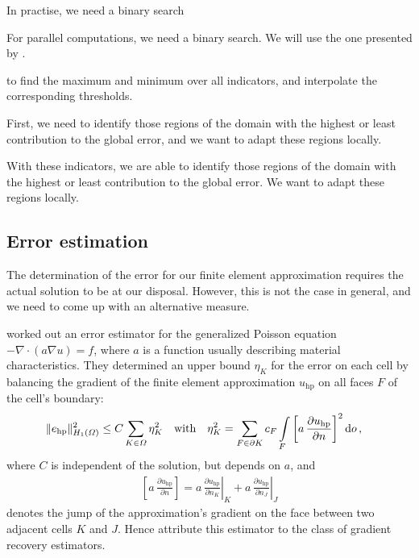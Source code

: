 In practise, we need a binary search 

For parallel computations, we need a binary search. We will use the one presented by \textcites[Sec.~3.1]{burstedde2008}[Sec.~5.1]{bangerth2012}.



to find the maximum and minimum over all indicators, and interpolate the corresponding thresholds.





First, we need to identify those regions of the domain with the highest or least contribution to the global error, and we want to adapt these regions locally.

With these indicators, we are able to identify those regions of the domain with the highest or least contribution to the global error. We want to adapt these regions locally.



\subsection{Error estimation}
\label{ssec:estimation}

The determination of the error for our finite element approximation requires the actual solution to be at our disposal. However, this is not the case in general, and we need to come up with an alternative measure.

\textcite{kelly1983} worked out an error estimator for the generalized Poisson equation $-\nabla \cdot \left( a \nabla u \right) = f$, where $a$ is a function usually describing material characteristics. They determined an upper bound $\eta_K$ for the error on each cell by balancing the gradient of the finite element approximation $u_\text{hp}$ on all faces $F$ of the cell's boundary:
\begin{align}
\label{eq:kelly} \|e_\text{hp}\|_{H_1(\Omega)}^2 &\leq C \sum\limits_{K \in \Omega} \eta_K^2 &&\text{with}&  \eta_K^2 &= \sum\limits_{F \in \partial K} c_F \int\limits_{F} \left[ a \, \frac{\partial u_\text{hp}}{\partial n} \right]^2 \mathop{}\!\mathrm{d}o \,\text{,}
\end{align}
where $C$ is independent of the solution, but depends on $a$, and
\begin{align*}
\left[ a \, \frac{\partial u_\text{hp}}{\partial n} \right] = \left. a \, \frac{\partial u_\text{hp}}{\partial n_K} \right|_K + \left. a \, \frac{\partial u_\text{hp}}{\partial n_J}\right|_J
\end{align*}
denotes the jump of the approximation's gradient on the face between two adjacent cells $K$ and $J$. Hence \textcite{ainsworth1997a} attribute this estimator to the class of gradient recovery estimators.

